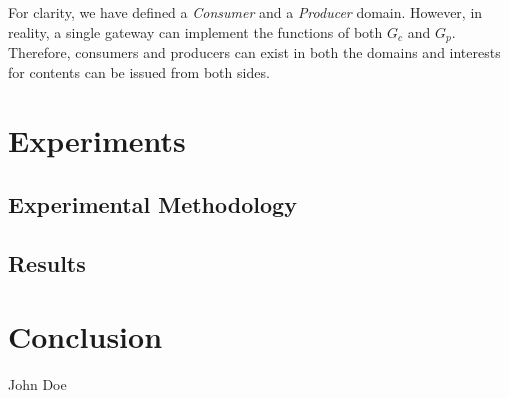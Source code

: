 \documentclass[conference,letterpaper,10pt]{IEEEtran}
\begin{document}
For clarity, we have defined a \textit{Consumer} and a \textit{Producer} domain. However, in reality, a single gateway can implement the functions of both $G_c$ and $G_p$. Therefore, consumers and producers can exist in both the domains and interests for contents can be issued from both sides.

\section{Experiments}

\subsection{Experimental Methodology}

\subsection{Results}

\section{Conclusion}\label{conclusion}


\ifCLASSOPTIONcaptionsoff
  \newpage
\fi

\tiny



\begin{IEEEbiography}{John Doe}
\blindtext
\end{IEEEbiography}
\end{document}
